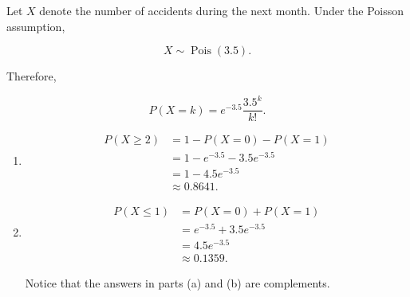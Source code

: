\documentclass[11pt]{article}
\newenvironment{solution}{
    \par
    \begin{tcolorbox}[
        colback=white,
        colframe=uwgold,
        boxrule=0.7pt,
        arc=2mm,
        left=3mm,
        right=3mm,
        top=2mm,
        bottom=2mm,
        breakable,
        before skip=0.5em,
        after skip=1em,
        title=\textbf{Solution},
        coltitle=uwpurple,
        fonttitle=\bfseries
    ]
}{
    \end{tcolorbox}
}
\begin{document}
\begin{solution}

Let \(X\) denote the number of accidents during the next month. Under the
Poisson assumption,

\[
X\sim\operatorname{Pois}(3.5).
\]

Therefore,

\[
P(X=k)=e^{-3.5}\frac{3.5^k}{k!}.
\]

\begin{enumerate}[label=(\alph*)]

\item

\[
\begin{aligned}
P(X\geq 2)
&=
1-P(X=0)-P(X=1)\\
&=
1-e^{-3.5}-3.5e^{-3.5}\\
&=
1-4.5e^{-3.5}\\
&\approx
 {0.8641}.
\end{aligned}
\]

\item

\[
\begin{aligned}
P(X\leq 1)
&=
P(X=0)+P(X=1)\\
&=
e^{-3.5}+3.5e^{-3.5}\\
&=
4.5e^{-3.5}\\
&\approx
 {0.1359}.
\end{aligned}
\]

Notice that the answers in parts (a) and (b) are complements.

\end{enumerate}

\end{solution}
 


\end{document}
